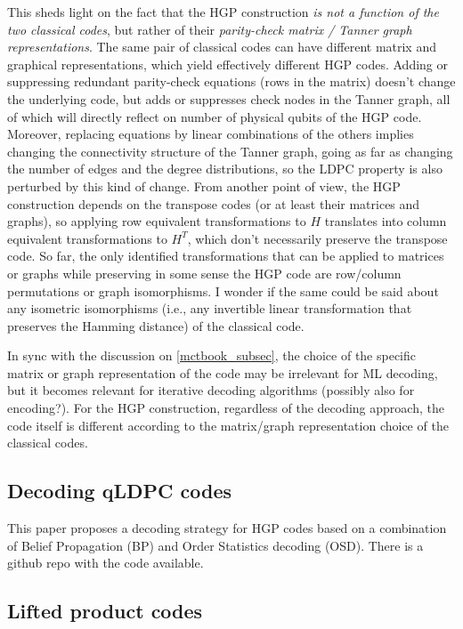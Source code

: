 \documentclass{article}
\begin{document}
This sheds light on the fact that the HGP construction \textit{is not a function of the two classical codes}, but rather of their \textit{parity-check matrix / Tanner graph representations}. The same pair of classical codes can have different matrix and graphical representations, which yield effectively different HGP codes. Adding or suppressing redundant parity-check equations (rows in the matrix) doesn't change the underlying code, but adds or suppresses check nodes in the Tanner graph, all of which will directly reflect on number of physical qubits of the HGP code. Moreover, replacing equations by linear combinations of the others implies changing the connectivity structure of the Tanner graph, going as far as changing the number of edges and the degree distributions, so the LDPC property is also perturbed by this kind of change. From another point of view, the HGP construction depends on the transpose codes (or at least their matrices and graphs), so applying row equivalent transformations to $H$ translates into column equivalent transformations to $H^T$, which don't necessarily preserve the transpose code. So far, the only identified transformations that can be applied to matrices or graphs while preserving in some sense the HGP code are row/column permutations or graph isomorphisms. I wonder if the same could be said about any isometric isomorphisms (i.e., any invertible linear transformation that preserves the Hamming distance) of the classical code. 

In sync with the discussion on \ref{mctbook_subsec}, the choice of the specific matrix or graph representation of the code may be irrelevant for ML decoding, but it becomes relevant for iterative decoding algorithms (possibly also for encoding?). For the HGP construction, regardless of the decoding approach, the code itself is different according to the matrix/graph representation choice of the classical codes. 


\subsection{Decoding qLDPC codes} \label{decoding_qLDPC_subsec}

This paper proposes a decoding strategy for HGP codes based on a combination of Belief Propagation (BP) and Order Statistics decoding (OSD). There is a github repo with the code available. 


\subsection{Lifted product codes} \label{liftedproduct_subsec}
\end{document}
